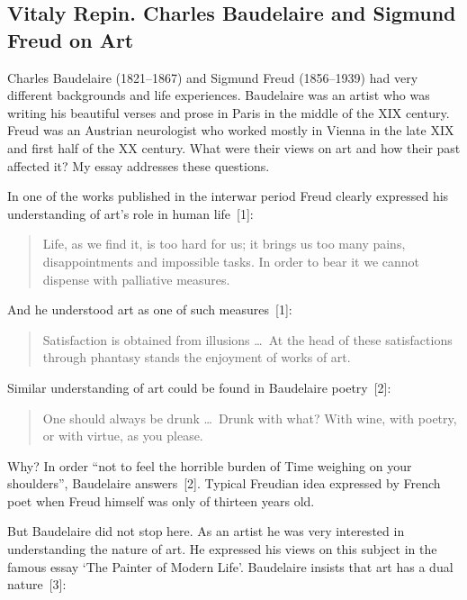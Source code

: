 
\subsection*{Vitaly Repin. Charles Baudelaire and Sigmund Freud on Art}

\begin{multicols}{2}
Charles Baudelaire (1821--1867) and Sigmund Freud (1856--1939) had very different backgrounds and life experiences.
Baudelaire was an artist who was writing his beautiful verses and prose in Paris in the middle of the XIX century.
Freud was an Austrian neurologist who worked mostly in Vienna in the late XIX and first half of the XX century.
What were their views on art and how their past affected it? My essay addresses these questions.

In one of the works published in the interwar period Freud clearly expressed his understanding of art's role in human life~[1]:

\begin{quote}
	Life, as we find it, is too hard for us; it brings us too many pains, disappointments and impossible tasks. In order to bear it we cannot dispense with palliative measures.
\end{quote}

And he understood art as one of such measures~[1]:

\begin{quote}
	Satisfaction is obtained from illusions \dots\ At the head of these satisfactions through phantasy stands
	the enjoyment of works of art.
\end{quote}

Similar understanding of art could be found in Baudelaire poetry~[2]:

\begin{quote}
	One should always be drunk \dots\ Drunk with what? With wine, with poetry, or with virtue, as you please.
\end{quote}

Why? In order ``not to feel the horrible burden of Time weighing on your shoulders'', Baudelaire answers~[2].
Typical Freudian idea expressed by French poet when Freud himself was only of thirteen years old.

But Baudelaire did not stop here. As an artist he was very interested in understanding the nature of art.
He expressed his views on this subject in the famous essay ‘The Painter of Modern Life’. Baudelaire insists that
art has a dual nature~[3]:


\end{multicols}
